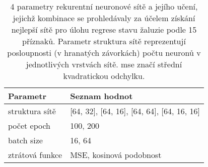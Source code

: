 \begin{table}[htbp]
  \centering
    \begin{tabular}{l|l}
    \toprule
    Parametr & Seznam hodnot \\
    \midrule
    \midrule
    struktura sítě & [64, 32], [64, 16], [64, 64], [64, 16, 16] \\
    \midrule
    počet epoch & 100, 200 \\
    \midrule
    batch size & 16, 64 \\
    \midrule
    ztrátová funkce & MSE, kosinová podobnost \\
    \bottomrule
    \bottomrule
    \end{tabular}%
    \caption[Prohledáváné parametry rekurentní neuronové sítě]{4 parametry rekurentní neuronové sítě a jejího učení, jejichž kombinace se prohledávaly za účelem získání nejlepší sítě pro úlohu regrese stavu žaluzie podle 15 příznaků. Parametr struktura sítě reprezentují posloupnosti (v hranatých závorkách) počtu neuronů v jednotlivých vrstvách sítě. \acrshort{mse} značí střední kvadratickou odchylku.}
  \label{tab:lstmhyper}%
\end{table}%
